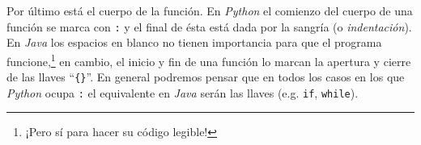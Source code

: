   Por último está el cuerpo de la función. 
  En \textit{Python} el comienzo del cuerpo de una función se marca con \texttt{:} y el final de 
  ésta está dada por la sangría (o \textit{indentación}).
  En \textit{Java} los espacios en blanco no tienen importancia para que el programa 
  funcione,\footnote{¡Pero sí para hacer su código legible!} en cambio, el inicio y fin de una 
  función lo marcan la apertura y cierre de las llaves \enquote{\texttt{\{\}}}.
  En general podremos pensar que en todos los casos en los que \textit{Python} ocupa \texttt{:} el
  equivalente en \textit{Java} serán las llaves (e.g. \texttt{if}, \texttt{while}).